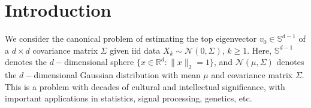 \documentclass[12pt]{article}
\def\gN{{\mathcal{N}}}
\def\sR{{\mathbb{R}}}
\def\sS{{\mathbb{S}}}
\begin{document}
\begin{abstract}
\end{abstract}
\section{Introduction}\label{sec:intro}

 We consider the canonical problem of estimating the top eigenvector $v_0\in\sS^{d-1}$ of a $d\times d$ covariance matrix $\Sigma$ given iid data $X_k\sim\gN(0,\Sigma)$, $k\geq 1$. Here, $\sS^{d-1}$ denotes the $d-$dimensional sphere $\{x\in\sR^d:\|x\|_2=1\}$, and $\gN(\mu,\Sigma)$ denotes the $d-$dimensional Gaussian distribution with mean $\mu$ and covariance matrix $\Sigma$. This is a problem with decades of cultural and intellectual significance, with important applications in statistics, signal processing, genetics, etc. 

 \medskip
 
\end{document}
